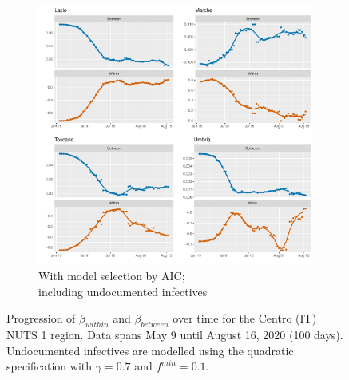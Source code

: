 \documentclass[12pt]{article}
\begin{document}
\begin{appendices}
\begin{figure}[H]
\begin{subfigure}{\textwidth}
    	      \includegraphics[width=\linewidth]{output/model_between_lag14_betas_Centro (IT)_aic_UndocQuadratic_rolling.pdf}
    	      \caption{With model selection by AIC; \\ including undocumented infectives}
    	      \label{fig:beta_between_over_time_centro_aic_undoc}
    	    \end{subfigure}
    	    \caption{Progression of $\beta_{within}$ and $\beta_{between}$ over time for the Centro (IT) NUTS 1 region. Data spans May 9 until August 16, 2020 (100 days). Undocumented infectives are modelled using the quadratic specification with $\gamma = 0.7$ and $f^{min}=0.1$.}
    	    \label{fig:beta_between_over_time_centro}
        \end{figure}
		

\end{appendices}
\end{document}
